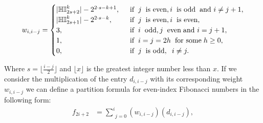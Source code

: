 \documentclass[10pt,twoside]{article}
\newcounter{neq}
\theoremstyle{definition}
\begin{document}
\[w_{i, i-j}=
\begin{cases}
|\mathbb{HI}_{2s+2}^k|- 2^{2\cdot s-k+1},  & \hspace{0.2cm}\text{if}\hspace{0.2cm}j\hspace{0.2cm}\text{is even}, i\hspace{0.2cm}\text{is odd}\hspace{0.2cm} \text{and }i\neq j+1, \\
|\mathbb{HI}_{2s+1}^k|- 2^{2\cdot s-k},  & \hspace{0.2cm}\text{if}\hspace{0.2cm}j\hspace{0.2cm}\text{is even}, i\hspace{0.2cm}\text{is even}, \\
3,&\hspace{0.2cm}\text{if}\hspace{0.2cm}i\hspace{0.2cm}\text{odd}, j\hspace{0.2cm}\text{even}   \hspace{0.1cm} \text{and } i=j+1,\\
1,&\hspace{0.2cm}\text{if}\hspace{0.2cm}i=j=2h\hspace{0.2cm}\text{for some}\hspace{0.1cm}h\geq0,\\
0,            &\hspace{0.2cm}\text{if}\hspace{0.2cm}j\hspace{0.2cm}\text{is odd},\hspace{0.2cm}i\neq j.\\
\end{cases}\]

Where $s=\lfloor\frac{i-j}{2}\rfloor$  and $\lfloor x\rfloor$ is the greatest integer number less than $x$. If we consider the multiplication of the entry $d_{i, i-j}$ with its corresponding weight $w_{i, i- j}$ we can define a partition formula for even-index Fibonacci numbers in the following form:
\begin{equation}\label{Fibonacci}
\begin{split}
f_{2i+2}&=\underset{j=0}{\overset{i}{\sum}}(w_{i,i-j})(d_{i, i-j}),
\end{split}
\end{equation}
\end{document}
